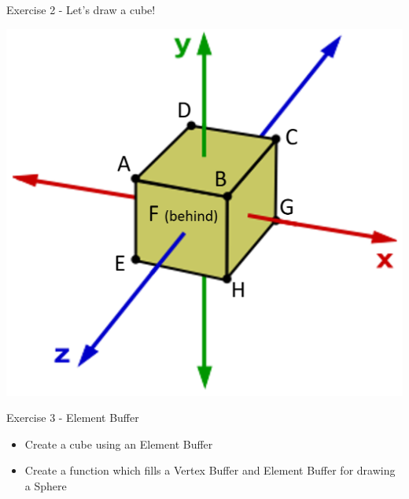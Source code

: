 \begin{frame}{Exercise 2 - Let's draw a cube!}
	\begin{center}
	\includegraphics[height=0.8\textheight]{cube_vertices}
	\end{center}
\end{frame}

\begin{frame}{Exercise 3 - Element Buffer}
	\begin{itemize}
		\item Create a cube using an Element Buffer
		\item Create a function which fills a Vertex Buffer and Element Buffer for drawing a Sphere
	\end{itemize}
\end{frame}


